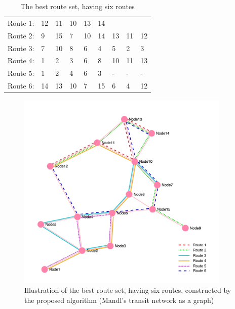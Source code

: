     \begin{table}[H]
    \centering
    \begin{tabular}{|l|l l l l l l l l|}
    \hline
    Route 1: & 12 & 11 & 10 & 13 & 14 &  &  &  \\
    Route 2: & 9 & 15 & 7 & 10 & 14 & 13 & 11 & 12 \\
    Route 3: & 7 & 10 & 8 & 6 & 4 & 5 & 2 & 3 \\
    Route 4: & 1 & 2 & 3 & 6 & 8 & 10 & 11 & 13 \\
    Route 5: & 1 & 2 & 4 & 6 & 3 & - & - & - \\
    Route 6: & 14 & 13 & 10 & 7 & 15 & 6 & 4 & 12 \\
    \hline
    \end{tabular}
    \caption {The best route set, having six routes}
    \label{table:performanceComparison_bestRouteSet6}
    \end{table}


    \begin{figure}[H]
    \begin{center}
    \includegraphics[width=4in]{assets/mandlnetwork_6routes.png}
    \end{center}
    \caption{Illustration of the best route set, having six routes, constructed by the proposed algorithm (Mandl's transit network as a graph)}
    \label{fig:bestRouteSet6} 
\end{figure}

